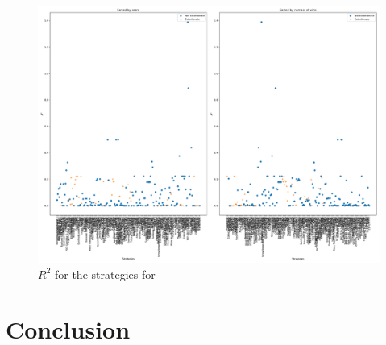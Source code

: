 \documentclass[a4paper]{article}
\begin{document}

\begin{figure}[!htbp]
    \centering
    \includegraphics[width=.8\textwidth]{./assets/img/R_squared_in_full/main.pdf}
    \caption{\(R^2\) for the strategies for } %
    \label{fig:R_squared_in_full}
\end{figure}


\section{Conclusion}\label{sec:conclusion}


\printbibliography
\end{document}

